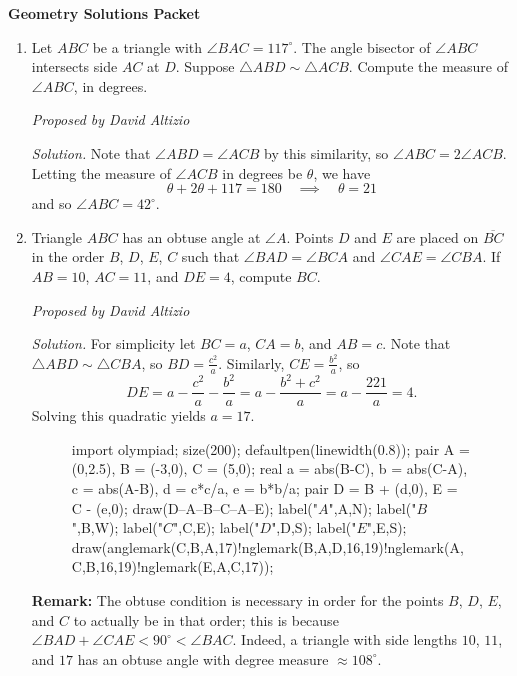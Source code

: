 \documentclass[10pt]{article}
\newcommand{\proposed}[1]
{
\vspace{5pt}
\noindent\textit{Proposed by #1}
}
\newcommand{\solution}
{
\vspace{5pt}
\noindent\textit{Solution.}\qquad
}
\begin{document}
\begin{center}
\huge\textbf{Geometry Solutions Packet}\normalsize

\vspace{3pt}
\end{center}

\begin{enumerate}

\item Let $ABC$ be a triangle with $\angle BAC=117^\circ$.  The angle bisector of $\angle ABC$ intersects side $AC$ at $D$.  Suppose $\triangle ABD\sim\triangle ACB$.  Compute the measure of $\angle ABC$, in degrees.

\proposed{David Altizio}

\solution Note that $\angle ABD=\angle ACB$ by this similarity, so $\angle ABC=2\angle ACB$.  Letting the measure of $\angle ACB$ in degrees be $\theta$, we have \[\theta+2\theta+117 = 180\quad\implies\quad\theta = 21\] and so $\angle ABC = \boxed{42^\circ}$.

\item Triangle $ABC$ has an obtuse angle at $\angle A$.  Points $D$ and $E$ are placed on $\overline{BC}$ in the order $B$, $D$, $E$, $C$ such that $\angle BAD=\angle BCA$ and $\angle CAE=\angle CBA$.  If $AB=10$, $AC=11$, and $DE=4$, compute $BC$.

\proposed{David Altizio}

\solution For simplicity let $BC=a$, $CA=b$, and $AB=c$.  Note that $\triangle ABD\sim\triangle CBA$, so $BD=\tfrac{c^2}a$.  Similarly, $CE=\tfrac{b^2}a$, so \[DE = a - \dfrac{c^2}a - \dfrac{b^2}a = a - \dfrac{b^2+c^2}a = a - \dfrac{221}a = 4.\] Solving this quadratic yields $a=\boxed{17}$.

\begin{figure}[ht]
	\centering
	\begin{asy}
	import olympiad;
	size(200);
	defaultpen(linewidth(0.8));
	pair A = (0,2.5), B = (-3,0), C = (5,0);
	real a = abs(B-C), b = abs(C-A), c = abs(A-B), d = c*c/a, e = b*b/a;
	pair D = B + (d,0), E = C - (e,0);
	draw(D--A--B--C--A--E);
	label("$A$",A,N);
	label("$B$",B,W);
	label("$C$",C,E);
	label("$D$",D,S);
	label("$E$",E,S);
	draw(anglemark(C,B,A,17)^^anglemark(B,A,D,16,19)^^anglemark(A,C,B,16,19)^^anglemark(E,A,C,17));
\end{asy}
\end{figure}

\par \textbf{Remark: } The obtuse condition is necessary in order for the points $B$, $D$, $E$, and $C$ to actually be in that order; this is because $\angle BAD+\angle CAE < 90^\circ < \angle BAC$.  Indeed, a triangle with side lengths $10$, $11$, and $17$ has an obtuse angle with degree measure $\approx 108^\circ$.


\end{enumerate}
\end{document}
